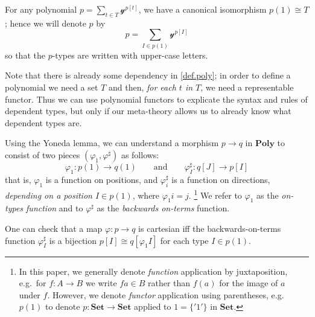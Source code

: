 \documentclass[11pt, one side, article]{memoir}
\theoremstyle{definition}
\theoremstyle{plain}
\newenvironment{remark}
  {\pushQED{\qed}\renewcommand{\qedsymbol}{$\lozenge$}\remarkx}
  {\popQED\endremarkx}
\newcommand{\Cat}[1]{\mathbf{#1}}%
\newcommand{\smset}{\Cat{Set}}
\newcommand{\yon}{\mathcal{y}}
\newcommand{\poly}{\Cat{Poly}}
\newcommand{\0}{\textsf{0}}
\newcommand{\1}{\tn{\textsf{1}}}
\newcommand{\qqand}{\qquad\text{and}\qquad}
\begin{document}
For any polynomial $p=\sum_{t\in T}\yon^{p[t]}$, we have a canonical isomorphism $p(1)\cong T$; hence we will denote $p$ by
\begin{equation}\label{eqn.poly_notation}
p=\sum_{I\in p(1)}\yon^{p[I]}
\end{equation}
so that the $p$-types are written with upper-case letters.

\begin{remark}
Note that there is already some dependency in \cref{def.poly}; in order to define a polynomial we need a set $T$ and then, \emph{for each $t$ in $T$}, we need a representable functor. Thus we can use polynomial functors to explicate the syntax and rules of dependent types, but only if our meta-theory allows us to already know what dependent types are.
\end{remark}

\begin{remark}\label{rem.positions_and_directions}
Using the Yoneda lemma, we can understand a morphism $p\to q$ in $\poly$ to consist of two pieces $(\varphi_1,\varphi^\sharp)$ as follows:
\begin{equation}\label{eqn.mapsharp}
  \varphi_1\colon p(1)\to q(1)
  \qqand
  \varphi^\sharp_I\colon q[J]\to p[I]
\end{equation}
that is, $\varphi_1$ is a function on positions, and $\varphi^\sharp_i$ is a function on directions, \emph{depending on a position $I\in p(1)$}, where $\varphi_1 i=j$.%
\footnote{
In this paper, we generally denote \emph{function} application by juxtaposition, e.g.\ for $f\colon A\to B$ we write $fa\in B$ rather than $f(a)$ for the image of $a$ under $f$. However, we denote \emph{functor} application using parentheses, e.g.\ $p(1)$ to denote $p\colon\smset\to\smset$ applied to $1=\{{'1'}\}$ in $\smset$.
}
We refer to $\varphi_1$ as the \emph{on-types function} and to $\varphi^\sharp$ as the \emph{backwards on-terms} function.

One can check that a map $\varphi\colon p\to q$ is cartesian iff the backwards-on-terms function $\varphi^\sharp_I$ is a bijection $p[I]\cong q[\varphi_1I]$ for each type $I\in p(1)$.
\end{remark}
\end{document}

